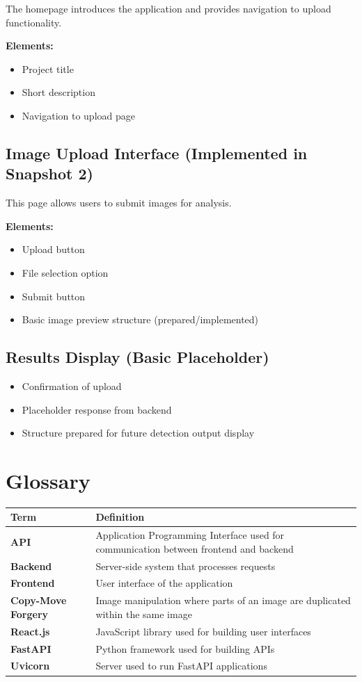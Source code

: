 \documentclass[12pt]{article}
\begin{document}
The homepage introduces the application and provides navigation to upload functionality.

\textbf{Elements:}
\begin{itemize}[noitemsep]
    \item Project title
    \item Short description
    \item Navigation to upload page
\end{itemize}

\subsection{Image Upload Interface (Implemented in Snapshot 2)}

This page allows users to submit images for analysis.

\textbf{Elements:}
\begin{itemize}[noitemsep]
    \item Upload button
    \item File selection option
    \item Submit button
    \item Basic image preview structure (prepared/implemented)
\end{itemize}

\subsection{Results Display (Basic Placeholder)}

\begin{itemize}[noitemsep]
    \item Confirmation of upload
    \item Placeholder response from backend
    \item Structure prepared for future detection output display
\end{itemize}

\section{Glossary}

\begin{longtable}{>{\bfseries}p{} p{}}
\toprule
Term & Definition \\
\midrule
\endhead
API & Application Programming Interface used for communication between frontend and backend \\[0.5em]
Backend & Server-side system that processes requests \\[0.5em]
Frontend & User interface of the application \\[0.5em]
Copy-Move Forgery & Image manipulation where parts of an image are duplicated within the same image \\[0.5em]
React.js & JavaScript library used for building user interfaces \\[0.5em]
FastAPI & Python framework used for building APIs \\[0.5em]
Uvicorn & Server used to run FastAPI applications \\
\bottomrule
\end{longtable}
\end{document}

